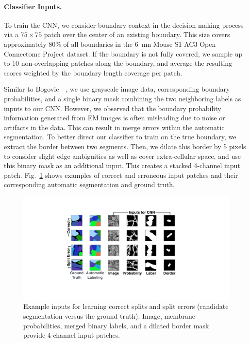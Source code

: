 \paragraph{Classifier Inputs.} To train the CNN, we consider boundary context in the decision making process via a $75\times75$ patch over the center of an existing boundary. This size covers approximately $80\%$ of all boundaries in the 6~nm Mouse S1 AC3 Open Connectome Project dataset. If the boundary is not fully covered, we sample up to 10 non-overlapping patches along the boundary, and average the resulting scores weighted by the boundary length coverage per patch.

Similar to Bogovic~\etal~\cite{BogovicHJ13}, we use grayscale image data, corresponding boundary probabilities, and a single binary mask combining the two neighboring labels as inputs to our CNN. However, we observed that the boundary probability information generated from EM images is often misleading due to noise or artifacts in the data. This can result in merge errors within the automatic segmentation. To better direct our classifier to train on the true boundary, we extract the border between two segments. Then, we dilate this border by 5 pixels to consider slight edge ambiguities as well as cover extra-cellular space, and use this binary mask as an additional input. This creates a stacked 4-channel input patch. Fig.~\ref{fig:cnn_inputs} shows examples of correct and erroneous input patches and their corresponding automatic segmentation and ground truth.

\begin{figure}[t]
\centering
\includegraphics[width=\linewidth]{gfx/cnn_inputs.pdf}
\caption{Example inputs for learning correct splits and split errors (candidate segmentation versus the ground truth). Image, membrane probabilities, merged binary labels, and a dilated border mask provide 4-channel input patches.}
\label{fig:cnn_inputs}
\end{figure}


